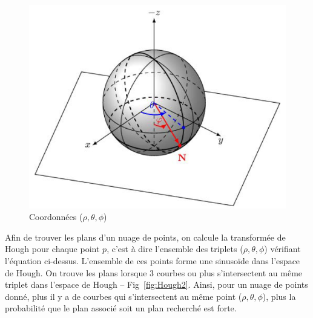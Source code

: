 \documentclass[12pt, twoside]{article}
\begin{document}
\begin{figure}[h]
\centering
\includegraphics[scale=0.5]{HoughCoord.png}
\caption{\label{fig:Hough1} Coordonnées ($\rho, \theta, \phi$)}
\end{figure}

Afin de trouver les plans d’un nuage de points, on calcule la transformée de Hough pour chaque point $p$, c’est à dire l’ensemble des triplets ($\rho, \theta, \phi$) vérifiant l’équation ci-dessus. L’ensemble de ces points forme une sinusoïde dans l’espace de Hough. On trouve les plans lorsque 3 courbes ou plus s’intersectent au même triplet dans l’espace de Hough -- Fig~\ref{fig:Hough2}. Ainsi, pour un nuage de points donné, plus il y a de courbes qui s’intersectent au même point ($\rho, \theta, \phi$), plus la probabilité que le plan associé soit un plan recherché est forte.
\end{document}
